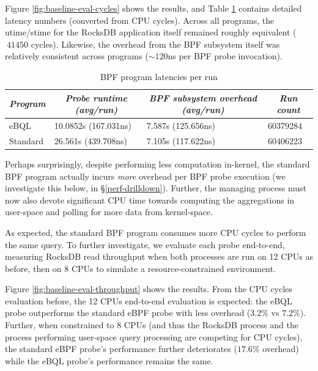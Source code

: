 Figure \ref{fig:baseline-eval-cycles} shows the results, and Table \ref{tab:baseline-eval-nums}
contains detailed latency numbers (converted from CPU cycles). Across all programs, the utime/stime
for the RocksDB application itself remained roughly equivalent ($~41450$ cycles). Likewise, the
overhead from the BPF subsystem itself was relatively consistent across programs ($\sim 120$ns per
BPF probe invocation).

\begin{table}[htpb]
    \centering
    \caption{BPF program latencies per run}
    \label{tab:baseline-eval-nums}
    \begin{tabular}{| l | l | l | l |}
        \hline
        \multicolumn{1}{|c|}{\textit{\textbf{Program}}} &
        \multicolumn{1}{c|}{\textit{\textbf{Probe runtime (avg/run)}}} &
        \multicolumn{1}{c|}{\textit{\textbf{BPF subsystem overhead (avg/run)}}} &
        \multicolumn{1}{c|}{\textit{\textbf{Run count}}}
        \tabularnewline \hline
        eBQL & 10.0852s (167.031ns) & 7.587s (125.656ns) & 60379284 \\
        \hline
        Standard & 26.561s (439.708ns) & 7.105s (117.622ns) & 60406223 \\
        \hline
    \end{tabular}
\end{table}

Perhaps surprisingly, despite performing less computation in-kernel, the
standard BPF program actually incurs \textit{more} overhead per BPF probe execution (we investigate
this below, in \S \ref{perf-drilldown}). Further, the managing process must now also devote
significant CPU time towards computing the aggregations in user-space and polling for more data from
kernel-space.

As expected, the standard BPF program consumes more CPU cycles to perform the same query. To further
investigate, we evaluate each probe end-to-end, measuring RocksDB read throughput when both
processes are run on 12 CPUs as before, then on 8 CPUs to simulate a resource-constrained
environment.

Figure \ref{fig:baseline-eval-throughput} shows the results. From the CPU cycles evaluation before,
the 12 CPUs end-to-end evaluation is expected: the eBQL probe outperforms the standard eBPF probe
with less overhead ($3.2\%$ vs $7.2\%$). Further, when constrained to 8 CPUs (and thus the RocksDB
process and the process performing user-space query processing are competing for CPU cycles), the
standard eBPF probe's performance further deteriorates ($17.6\%$ overhead) while the eBQL probe's
performance remains the same.

